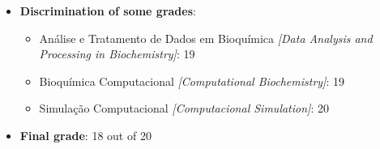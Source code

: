 \begin{itemize}
    \item \textbf{Discrimination of some grades}:
    \begin{itemize}
        \item Análise e Tratamento de Dados em Bioquímica \textit{[Data Analysis and Processing in Biochemistry]}: 19
        \item Bioquímica Computacional \textit{[Computational Biochemistry]}: 19
        \item Simulação Computacional \textit{[Computacional Simulation]}: 20
    \end{itemize}
    \item \textbf{Final grade}: 18 out of 20
\end{itemize}
